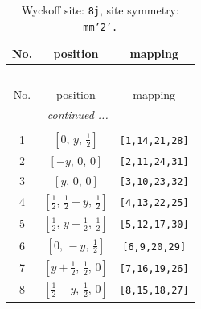 \documentclass[fleqn,8pt]{jsarticle}
\begin{document}
\begin{longtable}{ccc}
\caption{Wyckoff site: {\tt 8j}, site symmetry: {\tt mm'2'.}}
 \\
 \hline \hline
No. & position & mapping \\ \hline \endfirsthead

\multicolumn{2}{l}{\tablename\ \thetable{}} \\
 \hline \hline
No. & position & mapping \\ \hline \endhead

 \hline \hline
\multicolumn{2}{r}{\footnotesize\it continued ...} \\ \endfoot

 \hline \hline
\multicolumn{2}{r}{} \\ \endlastfoot

1 & $\left[ 0,\, y,\, \frac{1}{2} \right]$ & {\tt [1,14,21,28]} \\ \hline
2 & $\left[ - y,\, 0,\, 0 \right]$ & {\tt [2,11,24,31]} \\ \hline
3 & $\left[ y,\, 0,\, 0 \right]$ & {\tt [3,10,23,32]} \\ \hline
4 & $\left[ \frac{1}{2},\, \frac{1}{2} - y,\, \frac{1}{2} \right]$ & {\tt [4,13,22,25]} \\ \hline
5 & $\left[ \frac{1}{2},\, y + \frac{1}{2},\, \frac{1}{2} \right]$ & {\tt [5,12,17,30]} \\ \hline
6 & $\left[ 0,\, - y,\, \frac{1}{2} \right]$ & {\tt [6,9,20,29]} \\ \hline
7 & $\left[ y + \frac{1}{2},\, \frac{1}{2},\, 0 \right]$ & {\tt [7,16,19,26]} \\ \hline
8 & $\left[ \frac{1}{2} - y,\, \frac{1}{2},\, 0 \right]$ & {\tt [8,15,18,27]} \\
\end{longtable}
\renewcommand{\arraystretch}{1.2}
\end{document}
